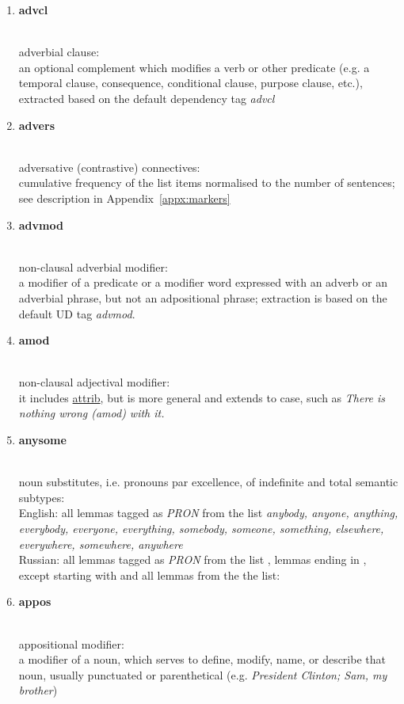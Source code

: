 \begin{enumerate}
	\item \hypertarget{ft:advcl}{\textbf{advcl}} \\
		adverbial clause: \\
		an optional complement which modifies a verb or other predicate (e.g. a temporal clause, consequence, conditional clause, purpose clause, etc.), extracted based on the default dependency tag \textit{advcl}
		
	\item \hypertarget{ft:advers}{\textbf{advers}} \\
		adversative (contrastive) connectives: \\
		cumulative frequency of the list items normalised to the number of sentences; see description in Appendix~\ref{appx:markers}
	
	\item \hypertarget{ft:advmod}{\textbf{advmod}} \\
		 non-clausal adverbial modifier: \\
		 a modifier of a predicate or a modifier word expressed with an adverb or an adverbial phrase, but not an adpositional phrase; extraction is based on the default UD tag \textit{advmod}.
		 
	\item \hypertarget{ft:amod}{\textbf{amod}} \\
		non-clausal adjectival modifier: \\ 
		it includes \hyperlink{ft:attrib}{attrib}, but is more general and extends to case, such as \textit{There is nothing wrong (amod) with it.}
	
	\item \hypertarget{ft:anysome}{\textbf{anysome}} \\
		noun substitutes, i.e. pronouns par excellence, of indefinite and total semantic subtypes: \\
		English: all lemmas tagged as \textit{PRON} from the list \textit{anybody, anyone, anything, everybody, everyone, everything, somebody, someone, something, elsewhere, everywhere, somewhere, anywhere} \\
		Russian: all lemmas tagged as \textit{PRON} from the list , lemmas ending in , except starting with  and all lemmas from the the list: 
	
	\item \hypertarget{ft:appos}{\textbf{appos}} \\
		appositional modifier: \\
		a modifier of a noun, which serves to define, modify, name, or describe that noun, usually punctuated or parenthetical (e.g. \textit{President Clinton; Sam, my brother})
		

\end{enumerate}

